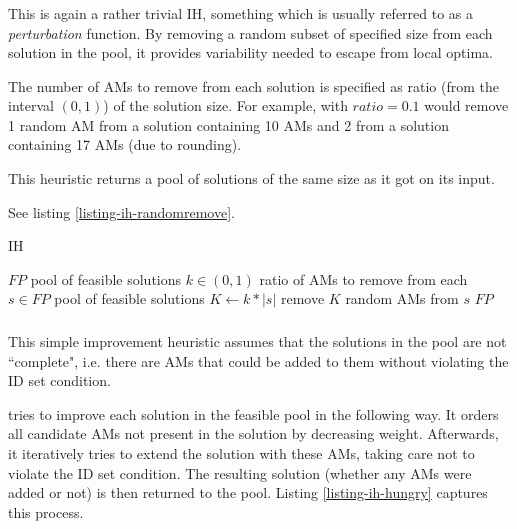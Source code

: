 \subsubsection{}

This is again a rather trivial IH, something which is usually referred to as a \textit{perturbation} function. %
By removing a random subset of specified size from each solution in the pool, it provides variability needed to escape from local optima. %

The number of AMs to remove from each solution is specified as ratio (from the interval $(0, 1)$) of the solution size. %
For example,  with $ratio = 0.1$ would remove 1 random AM from a solution containing 10 AMs and 2 from a solution containing 17 AMs (due to rounding).

This heuristic returns a pool of solutions of the same size as it got on its input.

See listing \ref{listing-ih-randomremove}.

\begin{algorithm}
\caption{ IH}
\label{listing-ih-randomremove}
\begin{algorithmic}
\REQUIRE $FP$ pool of feasible solutions
\REQUIRE $k \in (0,1)$ ratio of AMs to remove from each $s \in FP$
\ENSURE pool of feasible solutions
  \STATE $K \gets k * |s|$
  \STATE remove $K$ random AMs from $s$
\ENDFOR
\RETURN $FP$
\end{algorithmic}
\end{algorithm}

\subsubsection{}

This simple improvement heuristic assumes that the solutions in the pool are not ``complete", i.e. there are AMs that could be added to them without violating the ID set condition.

 tries to improve each solution in the feasible pool in the following way. It orders all candidate AMs not present in the solution by decreasing weight. Afterwards, it iteratively tries to extend the solution with these AMs, taking care not to violate the ID set condition. The resulting solution (whether any AMs were added or not) is then returned to the pool. Listing \ref{listing-ih-hungry} captures this process.

